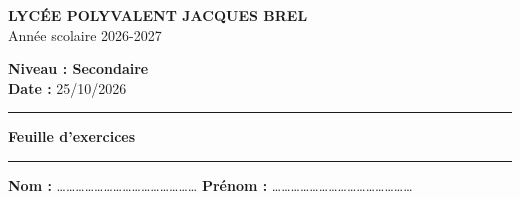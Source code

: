 \documentclass[11pt,a4paper]{article}
\begin{document}
\noindent
\begin{minipage}[t]{0.5\textwidth}
    \textbf{LYCÉE POLYVALENT JACQUES BREL} \\
    Année scolaire 2026-2027
\end{minipage}
\begin{minipage}[t]{0.5\textwidth}
    \raggedleft
    \textbf{Niveau : Secondaire} \\
    \textbf{Date : } 25/10/2026
\end{minipage}

\vspace{0.2cm}
\noindent\rule{\textwidth}{0.5pt}
\vspace{0.3cm}

\begin{center}
    {\LARGE \bfseries Feuille d'exercices}
\end{center}

\vspace{0.1cm}
\noindent\rule{\textwidth}{1.5pt}
\vspace{0.4cm}

\noindent
\textbf{Nom : } \dots\dots\dots\dots\dots\dots\dots\dots\dots\dots\dots\dots\dots\dots\dots\quad 
\textbf{Prénom : } \dots\dots\dots\dots\dots\dots\dots\dots\dots\dots\dots\dots\dots\dots\dots
\end{document}
